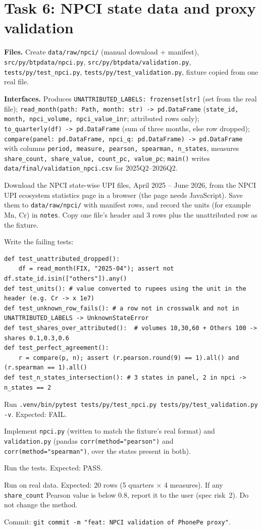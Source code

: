\documentclass[10pt,a4paper]{article}
\newcommand{\f}[1]{\texttt{#1}}
\begin{document}
\section{Task 6: NPCI state data and proxy validation}
\textbf{Files.} Create \f{data/raw/npci/} (manual download + manifest), \f{src/py/btpdata/npci.py},
\f{src/py/btpdata/validation.py}, \f{tests/py/test\_npci.py}, \f{tests/py/test\_validation.py}, fixture copied from one real file.

\textbf{Interfaces.} Produces \f{UNATTRIBUTED\_LABELS: frozenset[str]} (set from the real file);
\f{read\_month(path: Path, month: str) -> pd.DataFrame} (\f{state\_id, month, npci\_volume, npci\_value\_inr};
attributed rows only); \f{to\_quarterly(df) -> pd.DataFrame} (sum of three months, else row dropped);
\f{compare(panel: pd.DataFrame, npci\_q: pd.DataFrame) -> pd.DataFrame} with columns
\f{period, measure, pearson, spearman, n\_states}, measures \f{share\_count, share\_value, count\_pc, value\_pc};
\f{main()} writes \f{data/final/validation\_npci.csv} for 2025Q2--2026Q2.

\begin{steps}
\item Download the NPCI state-wise UPI files, April 2025 -- June 2026, from the NPCI UPI ecosystem statistics page
      in a browser (the page needs JavaScript). Save them to \f{data/raw/npci/} with manifest rows, and record the
      units (for example Mn, Cr) in \f{notes}. Copy one file's header and 3 rows plus the unattributed row as the fixture.
\item Write the failing tests:
\begin{verbatim}
def test_unattributed_dropped():
    df = read_month(FIX, "2025-04"); assert not df.state_id.isin(["others"]).any()
def test_units(): # value converted to rupees using the unit in the header (e.g. Cr -> x 1e7)
def test_unknown_row_fails(): # a row not in crosswalk and not in UNATTRIBUTED_LABELS -> UnknownStateError
def test_shares_over_attributed():  # volumes 10,30,60 + Others 100 -> shares 0.1,0.3,0.6
def test_perfect_agreement():
    r = compare(p, n); assert (r.pearson.round(9) == 1).all() and (r.spearman == 1).all()
def test_n_states_intersection(): # 3 states in panel, 2 in npci -> n_states == 2
\end{verbatim}
\item Run \f{.venv/bin/pytest tests/py/test\_npci.py tests/py/test\_validation.py -v}. Expected: FAIL.
\item Implement \f{npci.py} (written to match the fixture's real format) and \f{validation.py} (pandas
      \f{corr(method="pearson")} and \f{corr(method="spearman")}, over the states present in both).
\item Run the tests. Expected: PASS.
\item Run on real data. Expected: 20 rows (5 quarters $\times$ 4 measures). If any \f{share\_count} Pearson
      value is below 0.8, report it to the user (spec risk~2). Do not change the method.
\item Commit: \f{git commit -m "feat: NPCI validation of PhonePe proxy"}.
\end{steps}
\end{document}
